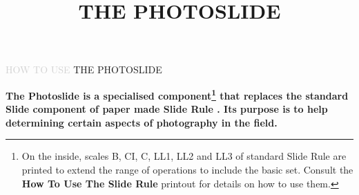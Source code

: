 
\usepackage{background}
\usetikzlibrary{calc}
\usepackage{color}
\usepackage{fixltx2e}
\usepackage{unicode-math}
\usepackage{fancybox}
\usepackage{amsmath}
\usepackage{graphicx}



\newcommand{\makefulltitle}{How To Use The Photoslide }



\title{\fontsize{60}{60}\selectfont THE PHOTOSLIDE}
\preauthor{}\postauthor{}\author{}
\predate{}\postdate{}\date{}
\everymath{\displaystyle}


  \begin{center}
    \headingfont\fontsize{28}{28}\selectfont \textcolor{lightgray}{HOW TO USE} THE PHOTOSLIDE
  \end{center}

  \nosection{}
  \large\textbf{The Photoslide is a specialised component\footnote{On the inside, scales B, CI, C, LL1, LL2 and LL3 of standard Slide Rule are printed to extend the range of operations to include the basic set. Consult the \textbf{How To Use The Slide Rule} printout for details on how to use them.} that replaces the standard Slide component of paper made Slide Rule \modelname. Its purpose is to help determining certain aspects of photography in the field. }

